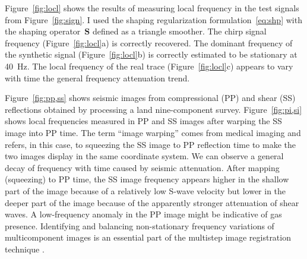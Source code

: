 Figure~\ref{fig:locl} shows the results of measuring local frequency
in the test signals from Figure~\ref{fig:sign}. I used the shaping
regularization formulation~\ref{eq:shp} with the shaping
operator~$\mathbf{S}$ defined as a triangle smoother. The chirp signal
frequency (Figure~\ref{fig:locl}a) is correctly recovered.  The
dominant frequency of the synthetic signal (Figure~\ref{fig:locl}b) is
correctly estimated to be stationary at 40~Hz. The local frequency of
the real trace (Figure~\ref{fig:locl}c) appears to vary with time
  the general frequency attenuation trend.



Figure~\ref{fig:pp,ss} shows seismic images from compressional (PP)
and shear (SS) reflections obtained by processing a land
nine-component survey. Figure~\ref{fig:pi,si} shows local frequencies
measured in PP and SS images after warping the SS image into PP time.
The term ``image warping'' comes from medical imaging \cite[]{wolberg}
and refers, in this case, to squeezing the SS image to PP reflection
time to make the two images display in the same coordinate system. We
can observe a general decay of frequency with time caused by seismic
attenuation. After mapping (squeezing) to PP time, the SS image
frequency appears higher in the shallow part of the image because of a
relatively low S-wave velocity but lower in the deeper part of the
image because of the apparently stronger attenuation of shear waves. A
low-frequency anomaly in the PP image might be indicative of gas
presence. Identifying and balancing non-stationary frequency
variations of multicomponent images is an essential part of the
multistep image registration technique
\cite[]{SEG-2003-07810784,warp}.

